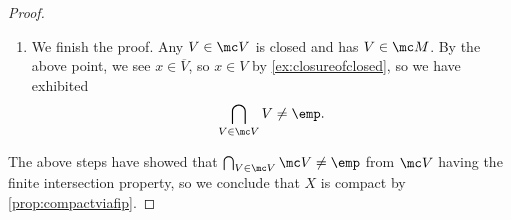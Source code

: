 \documentclass[../notes.tex]{subfiles}
\begin{document}
\begin{proof}
\begin{enumerate}
		\item We finish the proof. Any $V\in\mc V$ is closed and has $V\in\mc M$. By the above point, we see $x\in\overline V$, so $x\in V$ by \autoref{ex:closureofclosed}, so we have exhibited
		\[\bigcap_{V\in\mc V}V\ne\emp.\]
	\end{enumerate}
	The above steps have showed that $\bigcap_{V\in\mc V}\mc V\ne\emp$ from $\mc V$ having the finite intersection property, so we conclude that $X$ is compact by \autoref{prop:compactviafip}. 
\end{proof}
\end{document}
